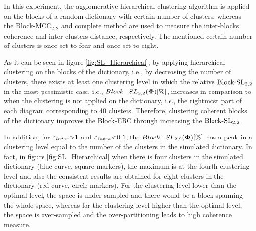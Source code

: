 \label{sec:clusteringOFcoherent_BERC-BMIC} 

In this experiment, 
the agglomerative hierarchical clustering algorithm is applied on the blocks of a random dictionary with certain number of clusters, whereas the Block-MCC$_{2,2}$ and complete method are used to measure the inter-blocks coherence and inter-clusters distance, respectively.
The mentioned certain number of clusters is once set to four and once set to eight.

As it can be seen in figure \ref{fig:SL_Hierarchical}, by applying hierarchical clustering on the blocks of the dictionary, i.e., by decreasing the number of clusters, there exists at least one clustering level in which the relative $\mathrm{Block\text{{-}}SL}_{2,2}$ in the most pessimistic case, i.e., $Block{-}SL_{2,2}(\boldsymbol{\Phi})[\%]$, increases in comparison to when the clustering is not applied on the dictionary, i.e., the rightmost part of each diagram corresponding to 40 clusters.
Therefore, clustering coherent blocks of the dictionary improves the Block-ERC through increasing the $\mathrm{Block\text{{-}}SL}_{2,2}$.

In addition, for $\varepsilon_{inter} {>} 1$ and $\varepsilon_{intra} {<} 0.1$, the $Block{-}SL_{2,2}(\boldsymbol{\Phi})[\%]$ has a peak in a clustering level equal to the number of the clusters in the simulated dictionary.
In fact, in figure \ref{fig:SL_Hierarchical} when there is four clusters in the simulated dictionary (blue curve, square markers), the maximum is at the fourth clustering level and also the consistent results are obtained for eight clusters in the dictionary (red curve, circle markers).
For the clustering level lower than the optimal level, the space is under-sampled and there would be a block spanning the whole space, whereas for the clustering level higher than the optimal level, the space is over-sampled and the over-partitioning leads to high coherence measure.

\FloatBarrier